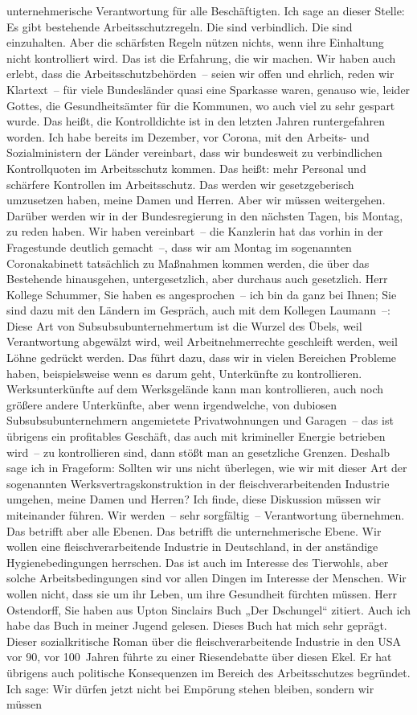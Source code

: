 \documentclass{article}
\begin{document}
unternehmerische Verantwortung für alle Beschäftigten.  Ich sage an dieser Stelle: Es gibt bestehende Arbeitsschutzregeln. Die sind verbindlich. Die sind einzuhalten. Aber die schärfsten Regeln nützen nichts, wenn ihre Einhaltung nicht kontrolliert wird. Das ist die Erfahrung, die wir machen.  Wir haben auch erlebt, dass die Arbeitsschutzbehörden – seien wir offen und ehrlich, reden wir Klartext – für viele Bundesländer quasi eine Sparkasse waren, genauso wie, leider Gottes, die Gesundheitsämter für die Kommunen, wo auch viel zu sehr gespart wurde. Das heißt, die Kontrolldichte ist in den letzten Jahren runtergefahren worden. Ich habe bereits im Dezember, vor Corona, mit den Arbeits- und Sozialministern der Länder vereinbart, dass wir bundesweit zu verbindlichen Kontrollquoten im Arbeitsschutz kommen. Das heißt: mehr Personal und schärfere Kontrollen im Arbeitsschutz. Das werden wir gesetzgeberisch umzusetzen haben, meine Damen und Herren.  Aber wir müssen weitergehen. Darüber werden wir in der Bundesregierung in den nächsten Tagen, bis Montag, zu reden haben. Wir haben vereinbart – die Kanzlerin hat das vorhin in der Fragestunde deutlich gemacht –, dass wir am Montag im sogenannten Coronakabinett tatsächlich zu Maßnahmen kommen werden, die über das Bestehende hinausgehen, untergesetzlich, aber durchaus auch gesetzlich. Herr Kollege Schummer, Sie haben es angesprochen – ich bin da ganz bei Ihnen; Sie sind dazu mit den Ländern im Gespräch, auch mit dem Kollegen Laumann –: Diese Art von Subsubsubunternehmertum ist die Wurzel des Übels, weil Verantwortung abgewälzt wird, weil Arbeitnehmerrechte geschleift werden, weil Löhne gedrückt werden. Das führt dazu, dass wir in vielen Bereichen Probleme haben, beispielsweise wenn es darum geht, Unterkünfte zu kontrollieren. Werksunterkünfte auf dem Werksgelände kann man kontrollieren, auch noch größere andere Unterkünfte, aber wenn irgendwelche, von dubiosen Subsubsubunternehmern angemietete Privatwohnungen und Garagen – das ist übrigens ein profitables Geschäft, das auch mit krimineller Energie betrieben wird – zu kontrollieren sind, dann stößt man an gesetzliche Grenzen. Deshalb sage ich in Frageform: Sollten wir uns nicht überlegen, wie wir mit dieser Art der sogenannten Werksvertragskonstruktion in der fleischverarbeitenden Industrie umgehen, meine Damen und Herren?  Ich finde, diese Diskussion müssen wir miteinander führen. Wir werden – sehr sorgfältig – Verantwortung übernehmen. Das betrifft aber alle Ebenen. Das betrifft die unternehmerische Ebene. Wir wollen eine fleischverarbeitende Industrie in Deutschland, in der anständige Hygienebedingungen herrschen. Das ist auch im Interesse des Tierwohls, aber solche Arbeitsbedingungen sind vor allen Dingen im Interesse der Menschen. Wir wollen nicht, dass sie um ihr Leben, um ihre Gesundheit fürchten müssen. Herr Ostendorff, Sie haben aus Upton Sinclairs Buch „Der Dschungel“ zitiert.  Auch ich habe das Buch in meiner Jugend gelesen. Dieses Buch hat mich sehr geprägt. Dieser sozialkritische Roman über die fleischverarbeitende Industrie in den USA vor 90, vor 100 Jahren führte zu einer Riesendebatte über diesen Ekel. Er hat übrigens auch politische Konsequenzen im Bereich des Arbeitsschutzes begründet.  Ich sage: Wir dürfen jetzt nicht bei Empörung stehen bleiben,  sondern wir müssen 
\end{document}
